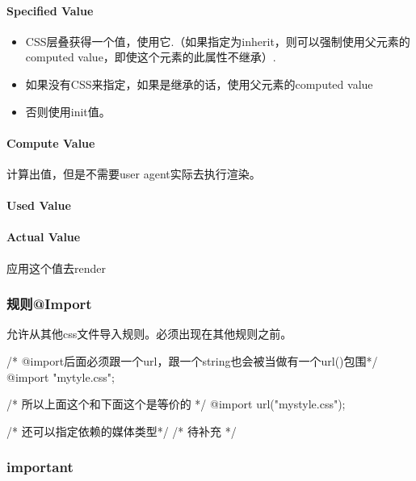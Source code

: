 \paragraph{Specified Value}

\begin{itemize}

\item CSS层叠获得一个值，使用它.（如果指定为inherit，则可以强制使用父元素的computed value，即使这个元素的此属性不继承）.

\item 如果没有CSS来指定，如果是继承的话，使用父元素的computed value

\item 否则使用init值。

\end{itemize}

\paragraph{Compute Value}

计算出值，但是不需要user agent实际去执行渲染。

\paragraph{Used Value}

\paragraph{Actual Value}

应用这个值去render


\subsubsection{规则@Import} 

允许从其他css文件导入规则。必须出现在其他规则之前。


\begin{CSS}
/* @import后面必须跟一个url，跟一个string也会被当做有一个url()包围*/
@import "mytyle.css";

/* 所以上面这个和下面这个是等价的 */
@import url("mystyle.css");

/* 还可以指定依赖的媒体类型*/
/* 待补充 */
\end{CSS}

\subsubsection{important}

